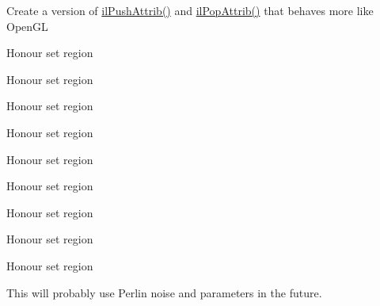 
\begin{DoxyRefList}
\item[\label{todo__todo000001}%
\hypertarget{todo__todo000001}{}%
Global \hyperlink{group__state_ga72e0879c71f59f06c35d2e2a10191fa8}{il\-Push\-Attrib} (I\-Luint Bits)]Create a version of \hyperlink{group__state_ga72e0879c71f59f06c35d2e2a10191fa8}{il\-Push\-Attrib()} and \hyperlink{group__state_gacc9ee35a9e48b55880655f6d143f39c1}{il\-Pop\-Attrib()} that behaves more like Open\-G\-L


\item[\label{todo__todo000002}%
\hypertarget{todo__todo000002}{}%
Global \hyperlink{group__ilu__filter_gacb6e1a0e8dc10748f1cfbf60b1f8c350}{ilu\-Alienify} (void)]Honour set region  
\item[\label{todo__todo000003}%
\hypertarget{todo__todo000003}{}%
Global \hyperlink{group__ilu__filter_ga017478330f243e5bb6e6edc29cdf1f37}{ilu\-Blur\-Avg} (I\-Luint Iter)]Honour set region  
\item[\label{todo__todo000004}%
\hypertarget{todo__todo000004}{}%
Global \hyperlink{group__ilu__filter_ga4163c484488b3afc352e3ed6c768babf}{ilu\-Blur\-Gaussian} (I\-Luint Iter)]Honour set region  
\item[\label{todo__todo000005}%
\hypertarget{todo__todo000005}{}%
Global \hyperlink{group__ilu__filter_gaeb5bb85ceb172bd9742f7f0730a1d440}{ilu\-Convolution} (I\-Lint $\ast$matrix, I\-Lint scale, I\-Lint bias)]Honour set region  
\item[\label{todo__todo000006}%
\hypertarget{todo__todo000006}{}%
Global \hyperlink{group__ilu__filter_gafbd320c463d5e8a45e68d0edb3973597}{ilu\-Edge\-Detect\-E} ()]Honour set region  
\item[\label{todo__todo000007}%
\hypertarget{todo__todo000007}{}%
Global \hyperlink{group__ilu__filter_gac902e008927e48ce132306e344f5010d}{ilu\-Edge\-Detect\-P} ()]Honour set region  
\item[\label{todo__todo000008}%
\hypertarget{todo__todo000008}{}%
Global \hyperlink{group__ilu__filter_ga91f176b607f5357b748079e21a6bbc63}{ilu\-Edge\-Detect\-S} ()]Honour set region  
\item[\label{todo__todo000009}%
\hypertarget{todo__todo000009}{}%
Global \hyperlink{group__ilu__filter_gab94eba669177860af590c7bed1927c30}{ilu\-Emboss} ()]Honour set region  
\item[\label{todo__todo000010}%
\hypertarget{todo__todo000010}{}%
Global \hyperlink{group__ilu__colour_ga0e3910809ea18e77a83cee05e12613ef}{ilu\-Invert\-Alpha} ()]Honour set region  
\item[\label{todo__todo000011}%
\hypertarget{todo__todo000011}{}%
Global \hyperlink{group__ilu__filter_gac4c1596626e01c41075c7fdeda113642}{ilu\-Noisify} (I\-Lclampf Tolerance)]This will probably use Perlin noise and parameters in the future.



\end{DoxyRefList}
